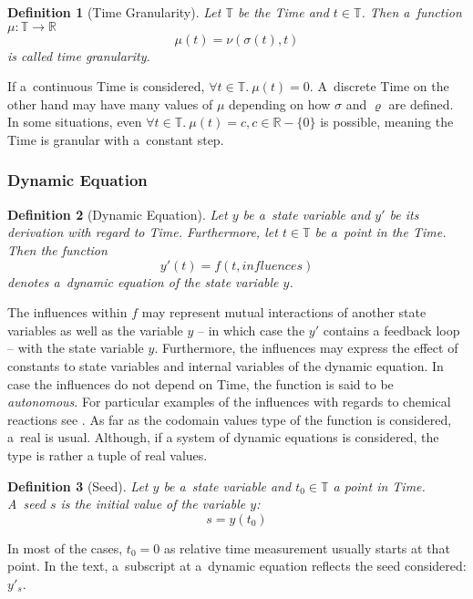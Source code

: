 \documentclass[12pt,oneside,draft]{fithesis}
\newcommand{\mReal}{\mathbb{R}}
\newcommand{\mTime}{\mathbb{T}}
\newtheorem{mydef}{Definition}
\begin{document}
\begin{mydef}[Time Granularity]
Let $\mTime$ be the Time and $t \in \mTime$. Then a~function
$\mu: \mTime \rightarrow \mReal$
	\begin{equation}
		\mu{}(t) = \nu{}(\sigma{}(t), t)
	\end{equation} is called time granularity.
\end{mydef}
If a~continuous Time is considered,
$\forall{}t\in\mTime.\:\mu{}(t) = 0$.
A~discrete Time on the other hand may have many values of $\mu$
depending on how $\sigma$ and $\varrho$ are defined. In some situations,
even $\forall{}t\in\mTime.\:\mu{}(t) = c, c \in \mReal - \{0\}$ is
possible, meaning the Time is granular with a~constant step.

\subsubsection{Dynamic Equation}
\begin{mydef}[Dynamic Equation]
Let $y$ be a~state variable and $y'$ be its derivation with regard to
Time. Furthermore, let $t \in \mTime$ be a~point in the Time.
Then the function
	\begin{equation}
		y'(t)=f(t, influences)
	\end{equation}
denotes a~dynamic equation of the state variable $y$.
\end{mydef}
The influences within $f$ may represent mutual interactions of another
state variables as well as the variable $y$ -- in which case the
$y'$ contains a feedback loop -- with the state variable $y$.
Furthermore, the influences may express the effect of constants to
state variables and internal variables of the dynamic equation. In case
the influences do not depend on Time, the function is said to be
\emph{autonomous}.
For particular examples of the influences with regards to
chemical reactions see \cite{sven}.
As far as the codomain values type of the function is considered, a~real
is usual. Although, if a system of dynamic equations is considered, the
type is rather a tuple of real values.

\begin{mydef}[Seed]
Let $y$ be a~state variable and $t_0 \in \mTime$ a point in Time.
A~seed $s$ is the initial value of the variable $y$:
	\begin{equation}
		s=y(t_0)
	\end{equation}
\end{mydef}
In most of the cases, $t_0 = 0$ as relative time measurement usually
starts at that point. In the text, a~subscript at a~dynamic equation
reflects the seed considered: $y'_s$.
\end{document}
